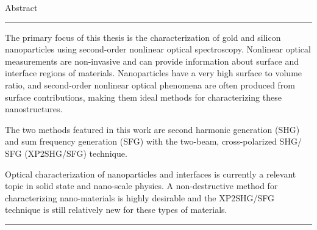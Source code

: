 \begin{vcenterpage}
{\LARGE{\sc Abstract}}

\noindent\rule[2pt]{\textwidth}{0.5pt}
The primary focus of this thesis is the characterization of gold and silicon nanoparticles using second-order nonlinear optical spectroscopy. Nonlinear optical measurements are non-invasive and can provide information about surface and interface regions of materials. Nanoparticles have a very high surface to volume ratio, and second-order nonlinear optical phenomena are often produced from surface contributions, making them ideal methods for characterizing these nanostructures.

The two methods featured in this work are second harmonic generation (SHG) and sum frequency generation (SFG) with the two-beam, cross-polarized SHG/ SFG (XP2SHG/SFG) technique.

Optical characterization of nanoparticles and interfaces is currently a relevant topic in solid state and nano-scale physics. A non-destructive method for characterizing nano-materials is highly desirable and the XP2SHG/SFG technique is still relatively new for these types of materials.

\noindent\rule[2pt]{\textwidth}{0.5pt}
\end{vcenterpage}
